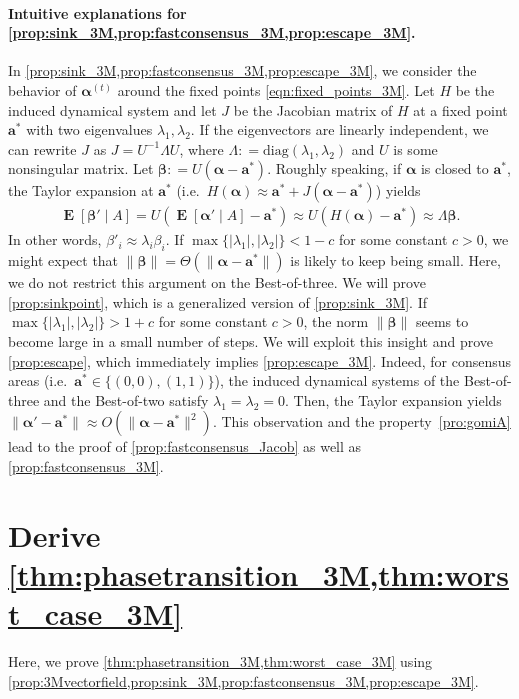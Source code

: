\documentclass[letterpaper,11pt]{article}
\DeclareMathOperator{\E}{\mathbf{E}}
\def\defeq{\mathrel{\mathop:}=}%
\begin{document}
\paragraph*{Intuitive explanations for \cref{prop:sink_3M,prop:fastconsensus_3M,prop:escape_3M}.}
In \cref{prop:sink_3M,prop:fastconsensus_3M,prop:escape_3M}, we consider the behavior of ${\boldsymbol \alpha}^{(t)}$ around the fixed points \cref{eqn:fixed_points_3M}.
Let $H$ be the induced dynamical system and let $J$ be the Jacobian matrix of $H$ at a fixed point $\mathbf{a}^*$ with two eigenvalues $\lambda_1,\lambda_2$.
If the eigenvectors are linearly independent, we can rewrite $J$ as $J=U^{-1}\Lambda U$, where $\Lambda\defeq\mathrm{diag}(\lambda_1,\lambda_2)$ and $U$ is some nonsingular matrix.
Let ${\boldsymbol \beta}\defeq U({\boldsymbol \alpha}-\mathbf{a}^*)$.
Roughly speaking, if ${\boldsymbol \alpha}$ is closed to $\mathbf{a}^*$, the Taylor expansion at $\mathbf{a}^*$ (i.e.~$H({\boldsymbol \alpha})\approx \mathbf{a}^*+ J({\boldsymbol \alpha}-\mathbf{a}^*)$) yields
\begin{align*}
\E[{\boldsymbol \beta}' \mid A] = U(\E[{\boldsymbol \alpha}'\mid A]-\mathbf{a}^*) \approx U(H({\boldsymbol \alpha})-\mathbf{a}^*) \approx \Lambda {\boldsymbol \beta}.
\end{align*}
In other words, $\beta'_i\approx \lambda_i\beta_i$.
If $\max\{|\lambda_1|,|\lambda_2|\}<1-c$ for some constant $c>0$, we might expect that  $\|{\boldsymbol \beta}\|=\Theta(\|{\boldsymbol \alpha}-\mathbf{a}^*\|)$ is likely to keep being small.
Here, we do not restrict this argument on the Best-of-three.
We will prove \cref{prop:sinkpoint}, which is a generalized version of \cref{prop:sink_3M}.
If $\max\{|\lambda_1|,|\lambda_2|\}>1+c$ for some constant $c>0$, the norm $\|{\boldsymbol \beta}\|$ seems to become large in a small number of steps.
We will exploit this insight and prove \cref{prop:escape}, which immediately implies \cref{prop:escape_3M}.
Indeed, for consensus areas (i.e.~$\mathbf{a}^*\in\{(0,0),(1,1)\}$), the induced dynamical systems of the Best-of-three and the Best-of-two satisfy $\lambda_1=\lambda_2=0$.
Then, the Taylor expansion yields $\|{\boldsymbol \alpha}' - \mathbf{a}^*\| \approx O(\|{\boldsymbol \alpha}-\mathbf{a}^*\|^2)$.
This observation and the property~\ref{pro:gomiA} lead to the proof of \cref{prop:fastconsensus_Jacob} as well as \cref{prop:fastconsensus_3M}.
%
\section[Derive Theorem 1.2 and 1.4]{Derive \cref{thm:phasetransition_3M,thm:worst_case_3M}}\label{sec:proofofmainthm}
Here, we prove \cref{thm:phasetransition_3M,thm:worst_case_3M} using \cref{prop:3Mvectorfield,prop:sink_3M,prop:fastconsensus_3M,prop:escape_3M}.
\end{document}
